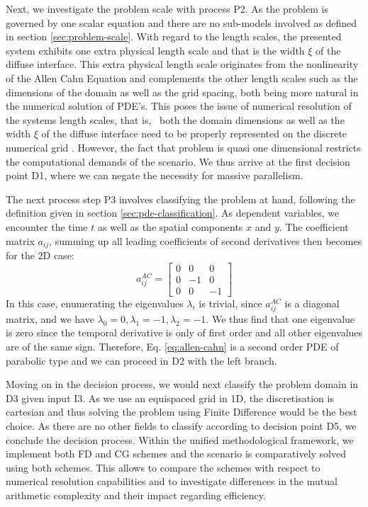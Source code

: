 \documentclass[sn-mathphys,Numbered]{sn-jnl}%
\theoremstyle{thmstyleone}%
\theoremstyle{thmstyletwo}%
\theoremstyle{thmstylethree}%
\begin{document}
Next, we investigate the problem scale with process P2.
As the problem is governed by one scalar equation and there are no sub-models involved as defined in section \ref{sec:problem-scale}. 
With regard to the length scales, the presented system exhibits one extra physical length scale and that is the width $\xi$ of the diffuse interface.
This extra physical length scale originates from the nonlinearity of the Allen Cahn Equation and complements the other length scales such as the dimensions of the domain as well as the grid spacing, both being more natural in the numerical solution of PDE's. 
This  poses the issue of numerical resolution of the systems length scales, that is, ~both the domain dimensions as well as the width $\xi$ of the diffuse interface need to be properly represented on the discrete numerical grid \cite{fleckSharpPhasefieldModeling2023,fleckFrictionlessMotionDiffuse2022}.
However, the fact that problem is quasi one dimensional  restricts the computational demands of the scenario.
We thus arrive at the first decision point D1, where we can negate the necessity for massive parallelism.

The next process step P3 involves classifying the problem at hand, following the definition given in section \ref{sec:pde-classification}.
As dependent variables, we encounter the time $t$ as well as the spatial components $x$ and $y$.
The coefficient matrix $a_{ij}$, summing up all leading coefficients of second derivatives then becomes for the 2D case:
\begin{equation}
    a_{ij}^{AC} = \begin{bmatrix}
        0 & 0 & 0 \\
        0 & -1 & 0 \\
        0 & 0 & -1
    \end{bmatrix}
\end{equation}
In this case, enumerating the eigenvalues $\lambda_i$ is trivial, since $a_{ij}^{AC}$ is a diagonal matrix, and we have $\lambda_0 = 0, \lambda_1 = -1, \lambda_2 = -1$.
We thus find that one eigenvalue is zero since the temporal derivative is only of first order and all other eigenvalues are of the same sign.
Therefore, Eq. \ref{eq:allen-cahn} is a second order PDE of parabolic type and we can proceed in D2 with the left branch.

Moving on in the decision process, we would next classify the problem domain in D3 given input I3.
As we use an equispaced grid in 1D, the discretisation is cartesian and thus solving the problem using Finite Difference would be the best choice.
As there are no other fields to classify according to decision point D5, we conclude the decision process.
Within the unified methodological framework, we implement both FD and CG schemes and the scenario is comparatively solved using both schemes.
This allows to compare the schemes with respect to numerical resolution capabilities and to investigate differences in the mutual arithmetic complexity and their impact regarding efficiency. 
\end{document}
